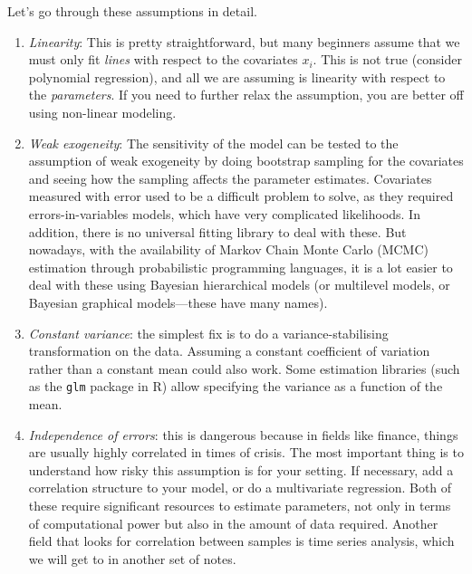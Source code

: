 Let's go through these assumptions in detail.  
\begin{enumerate}
  \item \textit{Linearity}: This is pretty straightforward, but many beginners assume that we must only fit \textit{lines} with respect to the covariates $x_i$. This is not true (consider polynomial regression), and all we are assuming is linearity with respect to the \textit{parameters}. If you need to further relax the assumption, you are better off using non-linear modeling. 

  \item \textit{Weak exogeneity}: The sensitivity of the model can be tested to the assumption of weak exogeneity by doing bootstrap sampling for the covariates and seeing how the sampling affects the parameter estimates. Covariates measured with error used to be a difficult problem to solve, as they required errors-in-variables models, which have very complicated likelihoods. In addition, there is no universal fitting library to deal with these. But nowadays, with the availability of Markov Chain Monte Carlo (MCMC) estimation through probabilistic programming languages, it is a lot easier to deal with these using Bayesian hierarchical models (or multilevel models, or Bayesian graphical models---these have many names).

  \item \textit{Constant variance}: the simplest fix is to do a variance-stabilising transformation on the data. Assuming a constant coefficient of variation rather than a constant mean could also work. Some estimation libraries (such as the \verb+glm+ package in R) allow specifying the variance as a function of the mean.

  \item \textit{Independence of errors}: this is dangerous because in fields like finance, things are usually highly correlated in times of crisis. The most important thing is to understand how risky this assumption is for your setting. If necessary, add a correlation structure to your model, or do  a multivariate regression. Both of these require significant resources to estimate parameters, not only in terms of computational power but also in the amount of data required. Another field that looks for correlation between samples is time series analysis, which we will get to in another set of notes. 


\end{enumerate}
